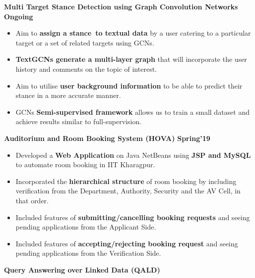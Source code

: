 \documentclass[10pt]{article}
\begin{document}
\vspace{-2.0ex}
\spacedhrule{0.1ex}{1.0ex}
\large {\textbf{Multi Target Stance Detection using Graph Convolution Networks}} \normalsize
\href{}{}
{\hfill} \textbf{Ongoing}\\[-1.8em]
\begin{itemize}
    \item Aim to \textbf{assign a stance to textual data} by a user catering to a particular target or a set of related targets using GCNs.\\[-2em]
    \item \textbf{TextGCNs generate a multi-layer graph} that will incorporate the user history and comments on the topic of interest.\\[-2em]
    \item Aim to utilise \textbf{user background information} to be able to predict their stance in a more accurate manner.\\[-2em]
    \item GCNs \textbf{Semi-supervised framework} allows us to train a small dataset and achieve results similar to full-supervision.\\[-1em]
\end{itemize}
\large {\textbf{Auditorium and Room Booking System (HOVA)}} \normalsize  \href{https://github.com/shmundhra/HOVA} {\hspace{0.5ex}\faMousePointer}
{\hfill} \textbf{Spring'19}\\[-1.8em]
\begin{itemize}
    \item Developed a \textbf{Web Application} on Java NetBeans using \textbf{JSP and MySQL} to automate room booking in IIT Kharagpur.\\[-2em]
    \item Incorporated the \textbf{hierarchical structure} of room booking by including verification from the Department, Authority, Security and the AV Cell, in that order.\\[-2em]
    \item Included features of \textbf{submitting/cancelling booking requests} and seeing pending applications from the Applicant Side.\\[-2em]
    \item Included features of \textbf{accepting/rejecting booking request} and seeing pending applications from the Verification Side.\\[-1em]
\end{itemize}
\large {\textbf{Query Answering over Linked Data (QALD)}} \normalsize \href{https://github.com/shmundhra/QALD}{\hspace{0.5ex}\faMousePointer}
\end{document}
